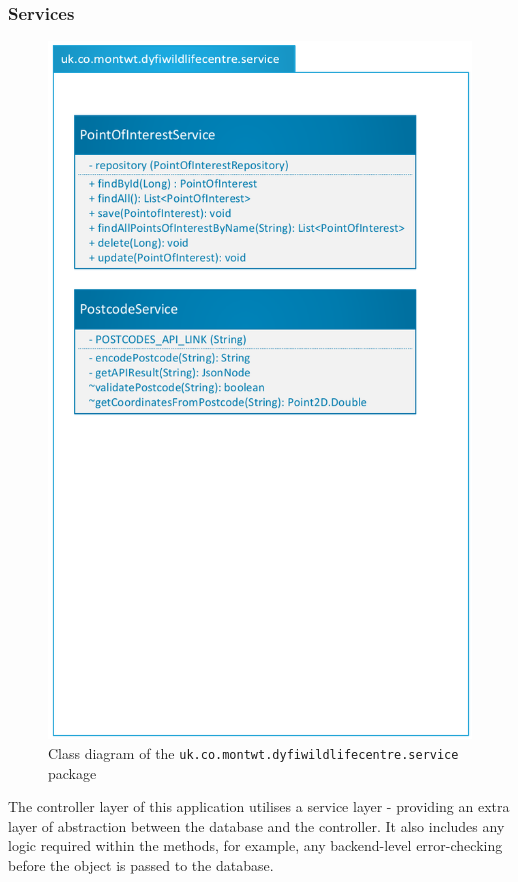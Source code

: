 \subsubsection{Services}
\begin{figure}[!htbp]
	\includegraphics[scale=0.4]{diagrams/modelservice}
	\caption{Class diagram of the \texttt{uk.co.montwt.dyfiwildlifecentre.service} package}
\end{figure}	

The controller layer of this application utilises a service layer - providing an extra layer of abstraction between the database and the controller. It also includes any logic required within the methods, for example, any backend-level error-checking before the object is passed to the database.


